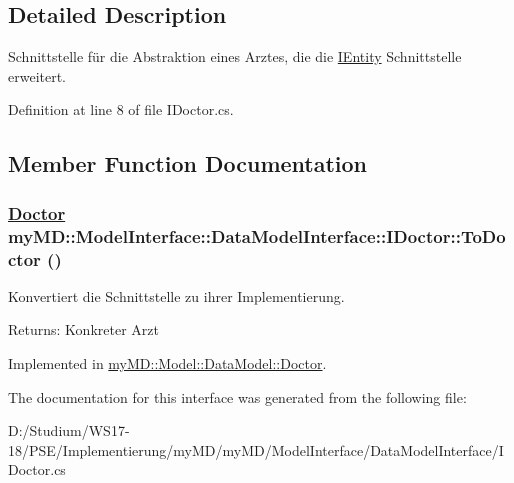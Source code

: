 \subsection{Detailed Description}
Schnittstelle f\"{u}r die Abstraktion eines Arztes, die die \hyperlink{interfacemy_m_d_1_1_model_interface_1_1_data_model_interface_1_1_i_entity}{IEntity} Schnittstelle erweitert. 



Definition at line 8 of file IDoctor.cs.

\subsection{Member Function Documentation}
\hypertarget{interfacemy_m_d_1_1_model_interface_1_1_data_model_interface_1_1_i_doctor_603e176dcbd8ab965588d1e0cb671f64}{
\subsubsection[ToDoctor]{\setlength{\rightskip}{0pt plus 5cm}\hyperlink{classmy_m_d_1_1_model_1_1_data_model_1_1_doctor}{Doctor} my\-MD::Model\-Interface::Data\-Model\-Interface::IDoctor::To\-Doctor ()}}
\label{d0/d0d/interfacemy_m_d_1_1_model_interface_1_1_data_model_interface_1_1_i_doctor_603e176dcbd8ab965588d1e0cb671f64}


Konvertiert die Schnittstelle zu ihrer Implementierung. 

\begin{Desc}
\item[Returns:]Konkreter Arzt\end{Desc}


Implemented in \hyperlink{classmy_m_d_1_1_model_1_1_data_model_1_1_doctor_603e176dcbd8ab965588d1e0cb671f64}{my\-MD::Model::Data\-Model::Doctor}.

The documentation for this interface was generated from the following file:\begin{CompactItemize}
\item 
D:/Studium/WS17-18/PSE/Implementierung/my\-MD/my\-MD/Model\-Interface/Data\-Model\-Interface/IDoctor.cs\end{CompactItemize}
